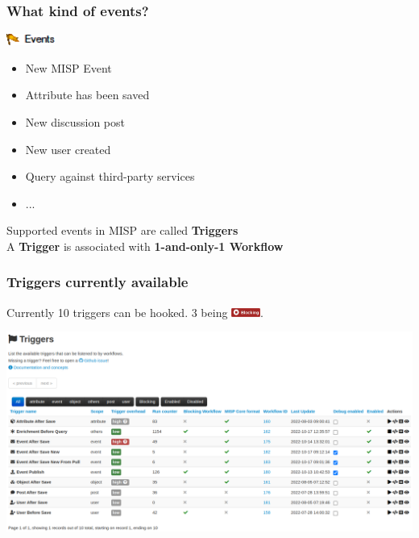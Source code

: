 \begin{frame}
    \frametitle{What kind of events?}
    \includegraphics[width=60px]{pictures/sc-event.png}
    \vspace*{0.5em}
    \begin{itemize}
        \item New MISP Event
        \item Attribute has been saved
        \item New discussion post
        \item New user created
        \item Query against third-party services
        \item ...
    \end{itemize}
    \vspace*{1em}
    {\Large {}} Supported events in MISP are called \textbf{Triggers}\\
    {\Large {}} A \textbf{Trigger} is associated with \textbf{1-and-only-1 Workflow}
\end{frame}

\begin{frame}
    \frametitle{Triggers currently available}
    Currently 10 triggers can be hooked. 3 being \includegraphics[width=36px]{pictures/blocking-workflow.png}.
    \begin{center}
        \includegraphics[width=1.0\linewidth]{pictures/triggers.png}
    \end{center}
\end{frame}

